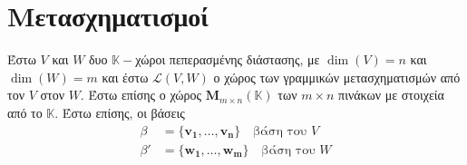 






\chapter{Μετασχηματισμοί}







Έστω $V$ και $W$ δυο $ \mathbb{K}- $χώροι πεπερασμένης διάστασης, με 
$ \dim(V) = n $ και $ \dim(W) = m $ και έστω $ \mathcal{L}(V,W) $ ο χώρος των 
γραμμικών μετασχηματισμών από τον $V$ στον $W$. Έστω επίσης ο χώρος 
$ \textbf{M}_{m \times n}(\mathbb{K}) $ των $ m \times n $ πινάκων με στοιχεία από το 
$ \mathbb{K} $. Έστω επίσης, οι βάσεις 
\begin{align*}
  \beta &= \{ \mathbf{v_{1}}, \ldots, \mathbf{v_{n}} \} \quad \text{βάση του $V$} \\
  \beta' &= \{ \mathbf{w_{1}}, \ldots, \mathbf{w_{m}} \} \quad \text{βάση του $W$}
\end{align*} 

